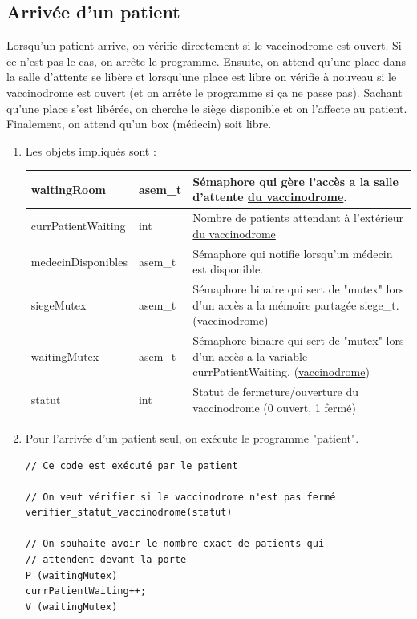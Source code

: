 \documentclass[a4paper]{article}
\begin{document}
  \subsection{Arrivée d'un patient}\label{arrivee-patient}

  Lorsqu'un patient arrive, on vérifie directement si le vaccinodrome est ouvert. Si ce n'est pas le cas, on arrête le programme. Ensuite, on attend qu'une place dans la salle d'attente se libère et lorsqu'une place est libre on vérifie à nouveau si le vaccinodrome est ouvert (et on arrête le programme si ça ne passe pas). Sachant qu'une place s'est libérée, on cherche le siège disponible et on l'affecte au patient.
  Finalement, on attend qu'un box (médecin) soit libre.

  \begin{enumerate}
    \item Les objets impliqués sont :

    \begin{tabularx}{\linewidth}{|l|l|>{\strut}X|}
      \hline%
      waitingRoom & asem\_t & Sémaphore qui gère l'accès a la salle d'attente \underline{du vaccinodrome}. \\ \hline%
      currPatientWaiting & int & Nombre de patients attendant à l'extérieur \underline{du vaccinodrome} \\ \hline%
      medecinDisponibles & asem\_t & Sémaphore qui notifie lorsqu'un médecin est disponible. \\ \hline%
      siegeMutex & asem\_t & Sémaphore binaire qui sert de "mutex" lors d'un accès a la mémoire partagée siege\_t. (\underline{vaccinodrome}) \\ \hline%
      waitingMutex & asem\_t & Sémaphore binaire qui sert de "mutex" lors d'un accès a la variable currPatientWaiting. (\underline{vaccinodrome}) \\ \hline%
      statut & int & Statut de fermeture/ouverture du vaccinodrome (0 ouvert, 1 fermé) \\ \hline%
    \end{tabularx}

    \item Pour l'arrivée d'un patient seul, on exécute le programme "patient".

    \begin{verbatim}
// Ce code est exécuté par le patient

// On veut vérifier si le vaccinodrome n'est pas fermé
verifier_statut_vaccinodrome(statut)

// On souhaite avoir le nombre exact de patients qui
// attendent devant la porte
P (waitingMutex)
currPatientWaiting++;
V (waitingMutex)


\end{verbatim}
\end{enumerate}
\end{document}
